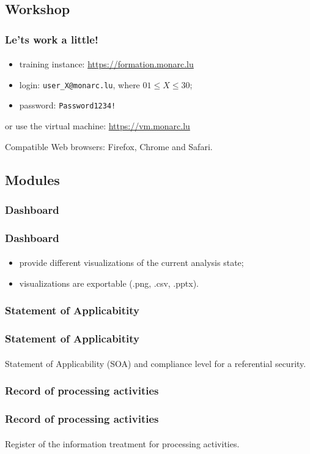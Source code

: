 \subsection{Workshop}
\begin{frame}
  \frametitle{Le'ts work a little!}
  \framesubtitle{}
  \begin{itemize}
    \item training instance: \url{https://formation.monarc.lu}
    \item login: \texttt{user\_X@monarc.lu}, where $01 \leq X \leq 30$;
    \item password: \texttt{Password1234!}
  \end{itemize}

  \bigskip

  or use the virtual machine: \url{https://vm.monarc.lu}

  \bigskip
  Compatible Web browsers: Firefox, Chrome and Safari.
\end{frame}



\subsection{Modules}
\subsubsection{Dashboard}
\begin{frame}
  \frametitle{Dashboard}
  \framesubtitle{}
  \begin{itemize}
    \item provide different visualizations of the current analysis state;
    \item visualizations are exportable (.png, .csv, .pptx).
  \end{itemize}
\end{frame}

\subsubsection{Statement of Applicabitity}
\begin{frame}
  \frametitle{Statement of Applicabitity}
  \framesubtitle{}
  Statement of Applicability (SOA) and compliance level for a referential security.
\end{frame}

\subsubsection{Record of processing activities}
\begin{frame}
  \frametitle{Record of processing activities}
  \framesubtitle{}
  Register of the information treatment for processing activities.
\end{frame}



